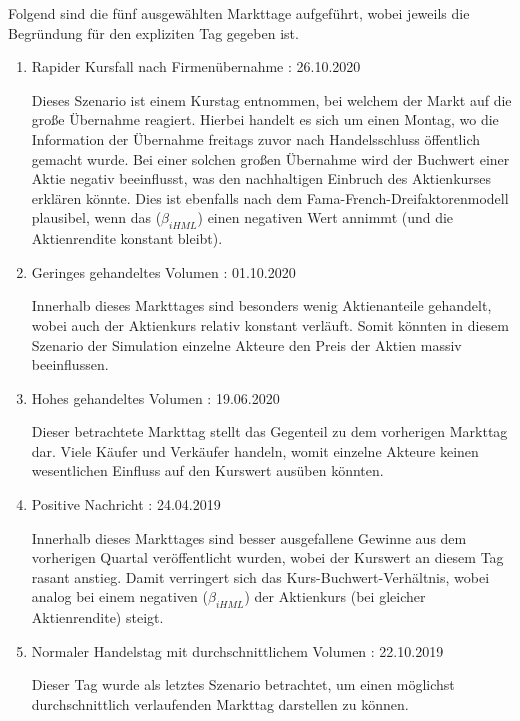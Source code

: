 Folgend sind die fünf ausgewählten Markttage aufgeführt, wobei jeweils die Begründung für den expliziten Tag gegeben ist.
\begin{enumerate}
	\item Rapider Kursfall nach Firmenübernahme : 26.10.2020
	
		Dieses Szenario ist einem Kurstag entnommen, bei welchem der Markt auf die große Übernahme reagiert. Hierbei handelt es sich um einen Montag, wo die Information der Übernahme freitags zuvor nach Handelsschluss öffentlich gemacht wurde. Bei einer solchen großen Übernahme wird der Buchwert einer Aktie negativ beeinflusst, was den nachhaltigen Einbruch des Aktienkurses erklären könnte. Dies ist ebenfalls nach dem Fama-French-Dreifaktorenmodell plausibel, wenn das ($\beta_{iHML}$) einen negativen Wert annimmt (und die Aktienrendite konstant bleibt).
	
	\item Geringes gehandeltes Volumen : 01.10.2020
	
		Innerhalb dieses Markttages sind besonders wenig Aktienanteile gehandelt, wobei auch der Aktienkurs relativ konstant verläuft. Somit könnten in diesem Szenario der Simulation einzelne Akteure den Preis der Aktien massiv beeinflussen.  
		
	\item Hohes gehandeltes Volumen : 19.06.2020
	
		Dieser betrachtete Markttag stellt das Gegenteil zu dem vorherigen Markttag dar. Viele Käufer und Verkäufer handeln, womit einzelne Akteure keinen wesentlichen Einfluss auf den Kurswert ausüben könnten.
	
	\item Positive Nachricht : 24.04.2019
	
		Innerhalb dieses Markttages sind besser ausgefallene Gewinne aus dem vorherigen Quartal veröffentlicht wurden, wobei der Kurswert an diesem Tag rasant anstieg. Damit verringert sich das Kurs-Buchwert-Verhältnis, wobei analog bei einem negativen ($\beta_{iHML}$) der Aktienkurs (bei gleicher Aktienrendite) steigt.
	
	\item Normaler Handelstag mit durchschnittlichem Volumen : 22.10.2019
	
		Dieser Tag wurde als letztes Szenario betrachtet, um einen möglichst durchschnittlich verlaufenden Markttag darstellen zu können.
	
\end{enumerate}

